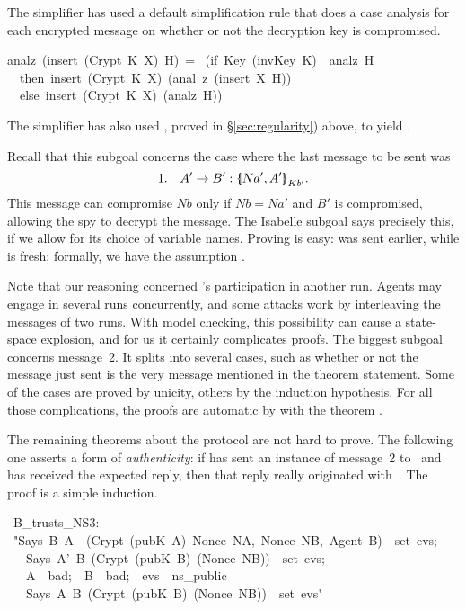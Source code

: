 %
The simplifier has used a 
default simplification rule that does a case
analysis for each encrypted message on whether or not the decryption key
is compromised.
\begin{isabelle} 
analz\ (insert\ (Crypt\ K\ X)\ H)\ =\isanewline 
\ (if\ Key\ (invKey\ K)\ \isasymin \ analz\ H\isanewline
\ \ then\ insert\
(Crypt\ K\ X)\ (anal\ z\ (insert\ X\ H))\isanewline 
\ \ else\ insert\ (Crypt\ K\ X)\ (analz\ H)) 
\end{isabelle} 
The simplifier has also used , proved in
{\S}\ref{sec:regularity}) above, to yield .

Recall that this subgoal concerns the case
where the last message to be sent was
\[ 1.\quad  A'\to B'  : \mathopen{\{\kern-.30em|} Na',A'\mathclose{|\kern-.32em\}}\sb{Kb'}. \]
This message can compromise $Nb$ only if $Nb=Na'$ and $B'$ is compromised,
allowing the spy to decrypt the message.  The Isabelle subgoal says
precisely this, if we allow for its choice of variable names.
Proving  is easy:  was
sent earlier, while  is fresh; formally, we have
the assumption
. 

Note that our reasoning concerned 's participation in another
run.  Agents may engage in several runs concurrently, and some attacks work
by interleaving the messages of two runs.  With model checking, this
possibility can cause a state-space explosion, and for us it
certainly complicates proofs.  The biggest subgoal concerns message~2.  It
splits into several cases, such as whether or not the message just sent is
the very message mentioned in the theorem statement.
Some of the cases are proved by unicity, others by
the induction hypothesis.  For all those complications, the proofs are
automatic by \isa{blast} with the theorem \isa{no_nonce_NS1_NS2}.

The remaining theorems about the protocol are not hard to prove.  The
following one asserts a form of \emph{authenticity}: if
 has sent an instance of message~2 to~ and has received the
expected reply, then that reply really originated with~\isa{A}.  The
proof is a simple induction.
\begin{isabelle}
\ B_trusts_NS3:\isanewline
\ "\isasymlbrakk Says\ B\ A\ \ (Crypt\ (pubK\ A)\ \isasymlbrace Nonce\ NA,\ Nonce\ NB,\ Agent\ B\isasymrbrace )\ \isasymin \ set\ evs;\isanewline
\ \ \ Says\ A'\ B\ (Crypt\ (pubK\ B)\ (Nonce\ NB))\ \isasymin \ set\ evs;\ \isanewline
\ \ \ A\ \isasymnotin \ bad;\ \ B\ \isasymnotin \ bad;\ \ evs\ \isasymin \ ns_public\isasymrbrakk \ \ \ \ \ \ \ \ \isanewline
\ \ \isasymLongrightarrow \ Says\ A\ B\ (Crypt\ (pubK\ B)\ (Nonce\ NB))\ \isasymin \ set\
evs"
\end{isabelle}

